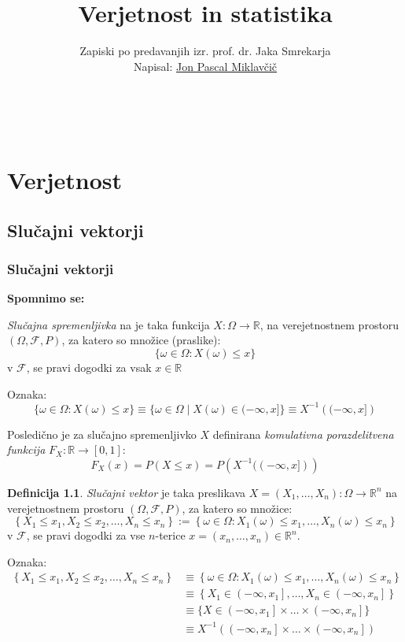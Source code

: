 \documentclass[12pt]{book}
\title{\Huge Verjetnost in statistika}
\author{\small Zapiski po predavanjih izr. prof. dr. Jaka Smrekarja \\ Napisal: \href{https://github.com/jonpascal/VIS-zapiski-predavanj}{Jon Pascal Miklavčič}}
\date{\filemodprintdate{\jobname}}
\makeatletter
\renewcommand{\maketitle}{
  \begin{titlepage}
    \begin{center}
      \vspace*{25mm} 
      \Huge\@title\par 
      \vspace{20mm} 
      \large\@author \\
      \vspace{140mm} 
      \large\@date\par 
    \end{center}
  \end{titlepage}
}
\def\n{\noindent}
\theoremstyle{definition}
\newtheorem{definicija}{Definicija}
\theoremstyle{plain}
\theoremstyle{plain}
\theoremstyle{plain}
\theoremstyle{remark}
\makeatother
\begin{document}
\frontmatter

\maketitle

\tableofcontents

\mainmatter

\part{Verjetnost}

\chapter{Slučajni vektorji}

\section{Slučajni vektorji}

\textbf{Spomnimo se:} 

\n \emph{Slučajna spremenljivka} na je taka funkcija $X: \Omega \to \mathbb{R}$, na verejetnostnem prostoru $(\Omega, \mathcal{F}, P)$, za katero so množice (praslike): 
$$
\{\omega \in \Omega: X(\omega) \leq x\}
$$
v $\mathcal{F}$, se pravi dogodki za vsak $x \in \mathbb{R}$

\n Oznaka:
$$
\{\omega \in \Omega: X(\omega) \leq x\} \equiv \{\omega \in \Omega \mid X(\omega) \in(-\infty, x]\} \equiv X^{-1}\left((-\infty, x]\right)
$$

\n Posledično je za slučajno spremenljivko $X$ definirana \emph{komulativna porazdelitvena funkcija} $F_X: \mathbb{R} \to [0,1]$:
$$
F_X(x)=P(X \leq x)=P\left(X^{-1}((-\infty, x])\right)
$$

\begin{definicija}
    \emph{Slučajni vektor} je taka preslikava $X=\left(X_1, \ldots, X_n\right): \Omega \to \mathbb{R}^n$ na verejetnostnem prostoru $(\Omega, \mathcal{F}, P)$, za katero so množice:
    $$
    \left\{X_1 \leq x_1, X_2 \leq x_2, \ldots, X_n \leq x_n\right\} :=\left\{\omega \in \Omega: X_1(\omega) \leq x_1, \ldots, X_n(\omega) \leq x_n\right\}
    $$
    v $\mathcal{F}$, se pravi dogodki za vse $n$-terice $x = \left(x_n, \ldots, x_n\right) \in \mathbb{R}^n$.
\end{definicija}

\n Oznaka: 
$$
\begin{aligned}
    \left\{X_1 \leq x_1, X_2 \leq x_2, \ldots, X_n \leq x_n\right\} &\equiv\left\{\omega \in \Omega: X_1(\omega) \leq x_1, \ldots, X_n(\omega) \leq x_n\right\} \\
    &\equiv \left\{X_1 \in\left(-\infty, x_1\right], \ldots, X_n \in\left(-\infty, x_n\right]\right\} \\ 
    &\equiv\{X \in\left(-\infty, x_1\right] \times \ldots \times\left(-\infty, x_n\right]\} \\
    &\equiv X^{-1}\left(\left(-\infty, x_n\right] \times \ldots \times\left(-\infty, x_n\right]\right)
\end{aligned}
$$
\end{document}
